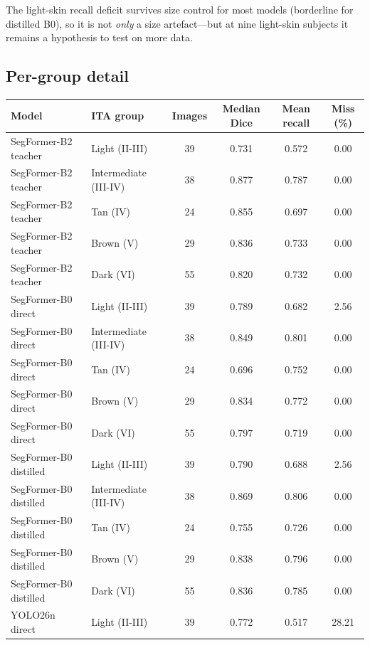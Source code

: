 \documentclass[11pt]{article}
\begin{document}
The light-skin recall deficit survives size control for most models (borderline for
distilled B0), so it is not \emph{only} a size artefact---but at nine light-skin subjects
it remains a hypothesis to test on more data.

\subsection*{Per-group detail}

\begin{center}
\small
\begin{tabular}{l l c c c c}
\toprule
Model & ITA group & Images & Median Dice & Mean recall & Miss (\%) \\
\midrule
SegFormer-B2 teacher & Light (II-III)        & 39 & 0.731 & 0.572 & 0.00 \\
SegFormer-B2 teacher & Intermediate (III-IV) & 38 & 0.877 & 0.787 & 0.00 \\
SegFormer-B2 teacher & Tan (IV)              & 24 & 0.855 & 0.697 & 0.00 \\
SegFormer-B2 teacher & Brown (V)             & 29 & 0.836 & 0.733 & 0.00 \\
SegFormer-B2 teacher & Dark (VI)             & 55 & 0.820 & 0.732 & 0.00 \\
\midrule
SegFormer-B0 direct & Light (II-III)         & 39 & 0.789 & 0.682 & 2.56 \\
SegFormer-B0 direct & Intermediate (III-IV)  & 38 & 0.849 & 0.801 & 0.00 \\
SegFormer-B0 direct & Tan (IV)               & 24 & 0.696 & 0.752 & 0.00 \\
SegFormer-B0 direct & Brown (V)              & 29 & 0.834 & 0.772 & 0.00 \\
SegFormer-B0 direct & Dark (VI)              & 55 & 0.797 & 0.719 & 0.00 \\
\midrule
SegFormer-B0 distilled & Light (II-III)        & 39 & 0.790 & 0.688 & 2.56 \\
SegFormer-B0 distilled & Intermediate (III-IV) & 38 & 0.869 & 0.806 & 0.00 \\
SegFormer-B0 distilled & Tan (IV)              & 24 & 0.755 & 0.726 & 0.00 \\
SegFormer-B0 distilled & Brown (V)             & 29 & 0.838 & 0.796 & 0.00 \\
SegFormer-B0 distilled & Dark (VI)             & 55 & 0.836 & 0.785 & 0.00 \\
\midrule
YOLO26n direct & Light (II-III)         & 39 & 0.772 & 0.517 & 28.21 \\

\end{tabular}
\end{center}
\end{document}
